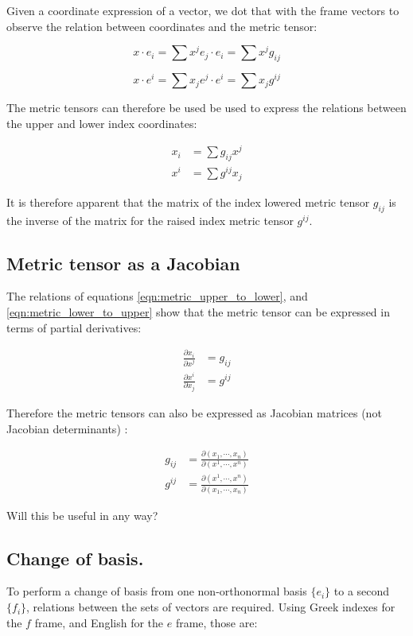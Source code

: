 \documentclass{article}      %
\begin{document}
Given a coordinate expression of a vector, we dot that with the frame vectors to observe the relation between coordinates and the metric tensor:

\[
x \cdot e_i = \sum x^j e_j \cdot e_i = \sum x^j g_{ij}
\]

\[
x \cdot e^i = \sum x_j e^j \cdot e^i = \sum x_j g^{ij}
\]

The metric tensors can therefore be used be used to express the relations between the upper and lower index coordinates:

\begin{align}
x_i &= \sum g_{ij} x^j \label{eqn:metric_upper_to_lower} \\
x^i &= \sum g^{ij} x_j \label{eqn:metric_lower_to_upper}
\end{align}

It is therefore apparent that the matrix of the index lowered metric tensor $g_{ij}$ is the inverse of the matrix for the raised index metric tensor $g^{ij}$.

\subsection{ Metric tensor as a Jacobian }

The relations of equations \ref{eqn:metric_upper_to_lower}, and \ref{eqn:metric_lower_to_upper} show that the metric tensor can be expressed in terms of partial derivatives:

\begin{align}
\frac{\partial x_i }{\partial x^j } &= g_{ij} \\
\frac{\partial x^i }{\partial x_j } &= g^{ij}
\end{align}

Therefore the metric tensors can also be expressed as Jacobian matrices (not Jacobian determinants) :

\begin{align}
g_{ij} &= \frac{\partial (x_1, \cdots, x_n) }{\partial (x^1, \cdots, x^n) } \\
g^{ij} &= \frac{\partial (x^1, \cdots, x^n) }{\partial (x_1, \cdots, x_n) }
\end{align}

Will this be useful in any way?

\subsection{ Change of basis. }

To perform a change of basis from one non-orthonormal basis $\{e_i\}$ to a second $\{f_i\}$, relations between the sets of vectors
are required.  Using Greek indexes for the $f$ frame, and English for the $e$ frame, those are:
\end{document}
